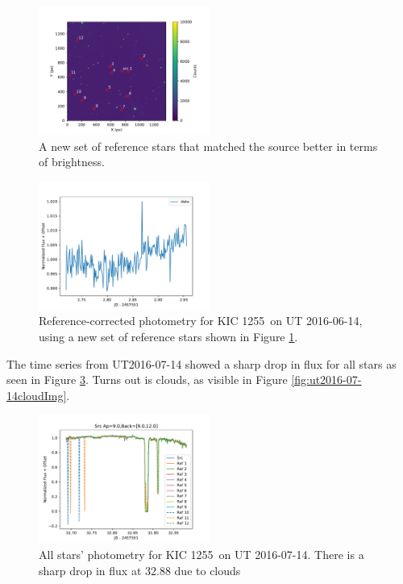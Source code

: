 \documentclass[twocolumn]{aastex61}
\newcommand{\shStar}{KIC 1255}
\begin{document}
\begin{figure}
\begin{centering}
\includegraphics[width=0.5\textwidth]{images/ut2016_04_14_analysis/st_labels}
\caption{A new set of reference stars that matched the source better in terms of brightness.}\label{fig:newRefStars}
\end{centering}
\end{figure}

\begin{figure}
\begin{centering}
\includegraphics[width=0.5\textwidth]{images/ut2016_04_14_analysis/refcor_01}
\caption{Reference-corrected photometry for \shStar\ on UT 2016-06-14, using a new set of reference stars shown in Figure \ref{fig:newRefStars}.}\label{fig:refCorrectedPhotJun14newStars}
\end{centering}
\end{figure}

The time series from UT2016-07-14 showed a sharp drop in flux for all stars as seen in Figure \ref{fig:ut2016-07-14clouds}.
Turns out is clouds, as visible in Figure \ref{fig:ut2016-07-14cloudImg}.

\begin{figure}
\begin{centering}
\includegraphics[width=0.5\textwidth]{images/ut2016_07_14_clouds/ut2016_07_14_tser_allstars.pdf}
\caption{All stars' photometry for \shStar\ on UT 2016-07-14.
There is a sharp drop in flux at 32.88 due to clouds}\label{fig:ut2016-07-14clouds}
\end{centering}
\end{figure}
\end{document}
